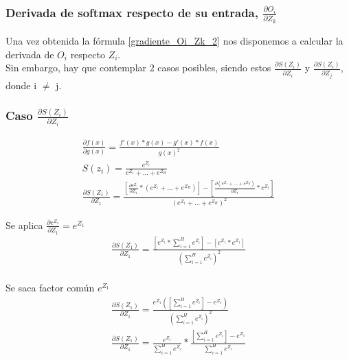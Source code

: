 
\subsubsection{Derivada de softmax respecto de su entrada, $\frac{\partial O_i}{\partial Z_k}$}

Una vez obtenida la fórmula \ref{gradiente_Oi_Zk_2} nos disponemos a calcular la derivada de $O_i$ respecto $Z_i$. \\
Sin embargo, hay que contemplar 2 casos posibles, siendo estos $\frac{\partial S(Z_i)}{\partial Z_i}$ y $\frac{\partial S(Z_i)}{\partial Z_j}$, donde i $\neq$ j. \\

\subsubsection{Caso $\frac{\partial S(Z_i)}{\partial Z_i}$}

\begin{gather}
	\frac{\partial f(x)}{\partial g(x)} = \frac{f'(x)*g(x) - g'(x)*f(x)}{g(x)^2} \\
	S(z_i) = \frac{e^{Z_i}}{e^{Z_1} + ... + e^{Z_H}} \\
	\frac{\partial S(Z_1)}{\partial Z_1} = \frac{[\frac{\partial e^{Z_1}}{\partial Z_1} * (e^{Z_1} + ... + e^{Z_H}) ] - [\frac{\partial (e^{Z_1} + ... + e^{Z_H})}{\partial Z_1} * e^{Z_1} ] }{(e^{Z_1} + ... + e^{Z_H})^2} 
\end{gather}

Se aplica $\frac{\partial e^{Z_1}}{\partial Z_1} = e^{Z_1}$ \\
\begin{gather}
	\frac{\partial S(Z_1)}{\partial Z_1} = \frac{[e^{Z_1} * \sum_{i=1}^{H}  e^{Z_i}] - [e^{Z_1} * e^{Z_1}]   }{ (\sum_{i=1}^{H}  e^{Z_i})^2} \\
\end{gather}

Se saca factor común $e^{Z_1}$ \\
\begin{gather}
	\frac{\partial S(Z_1)}{\partial Z_1} = \frac{e^{Z_1} ([\sum_{i=1}^{H}  e^{Z_i}] - e^{Z_1})  }{(\sum_{i=1}^{H}  e^{Z_i})^2} \\
	\frac{\partial S(Z_1)}{\partial Z_1} = \frac{e^{Z_1}}{\sum_{i=1}^{H}  e^{Z_i}} * \frac{[\sum_{i=1}^{H}  e^{Z_i}] - e^{Z_1}}{\sum_{i=1}^{H}  e^{Z_i}}
\end{gather}

